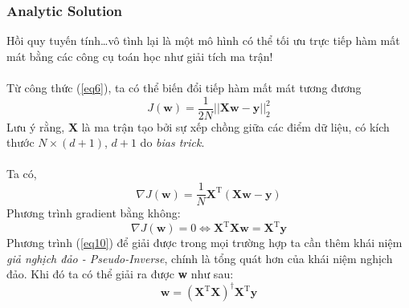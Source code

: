 \documentclass{article}
\begin{document}
\subsubsection*{Analytic Solution}
Hồi quy tuyến tính\ldots vô tình lại là một mô hình có thể tối ưu trực tiếp hàm mất mát bằng các công cụ toán học như giải tích ma trận!
\\\\
Từ công thức (\ref{eq6}), ta có thể biến đổi tiếp hàm mất mát tương đương
\begin{equation}
    J(\textbf{w}) = \frac{1}{2N}||\textbf{X}\textbf{w}-\textbf{y}||_{2}^{2}
    \label{eq8}
\end{equation}
Lưu ý rằng, \textbf{X} là ma trận tạo bởi sự xếp chồng giữa các điểm dữ liệu, có kích thước $N\times(d+1)$, $d+1$ do \textit{bias trick}.\\\\
Ta có,
\begin{equation}
    \nabla J(\textbf{w}) = \frac{1}{N} \textbf{X}^{\text{T}}(\textbf{X}\textbf{w}-\textbf{y})
    \label{eq9}
\end{equation}
Phương trình gradient bằng không:
\begin{equation}
    \nabla J(\textbf{w}) = 0 \Leftrightarrow \textbf{X}^{\text{T}}\textbf{X}\textbf{w}=\textbf{X}^{\text{T}}\textbf{y}
    \label{eq10}
\end{equation}
Phương trình (\ref{eq10}) để giải được trong mọi trường hợp ta cần thêm khái niệm \textit{giả nghịch đảo - Pseudo-Inverse}, chính là tổng quát hơn của khái niệm nghịch đảo. Khi đó ta có thể giải ra được \textbf{w} như sau:
\begin{equation}
    \textbf{w} = \left(\textbf{X}^{\text{T}}\textbf{X} \right)^{\dagger}\textbf{X}^{\text{T}}\textbf{y}
\end{equation}
\end{document}
